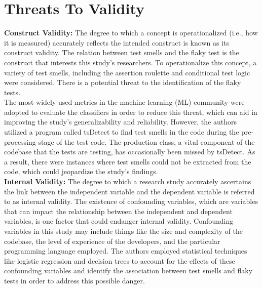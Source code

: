 \documentclass[sigconf,review]{acmart}
\begin{document}
 \section{Threats To Validity}
 \label{Section:Threats}

\textbf{Construct Validity:}
 The degree to which a concept is operationalized (i.e., how it is measured) accurately reflects the intended construct is known as its construct validity. The relation between test smells and the flaky test is the construct that interests this study's researchers. To operationalize this concept,  a variety of test smells, including the assertion roulette and conditional test logic were considered. There is a potential threat to the identification of the flaky tests.\\
 The most widely used metrics in the machine learning (ML) community were adopted to evaluate the classifiers in order to reduce this threat, which can aid in improving the study's generalizability and reliability. However, the authors utilized a program called tsDetect to find test smells in the code during the pre-processing stage of the test code. The production class, a vital component of the codebase that the tests are testing, has occasionally been missed by tsDetect. As a result, there were instances where test smells could not be extracted from the code, which could jeopardize the study's findings.
\\

\textbf{Internal Validity:}
 The degree to which a research study accurately ascertains the link between the independent variable and the dependent variable is referred to as internal validity. The existence of confounding variables, which are variables that can impact the relationship between the independent and dependent variables, is one factor that could endanger internal validity. Confounding variables in this study may include things like the size and complexity of the codebase, the level of experience of the developers, and the particular programming language employed. The authors employed statistical techniques like logistic regression and decision trees to account for the effects of these confounding variables and identify the association between test smells and flaky tests in order to address this possible danger.
\\
\end{document}
